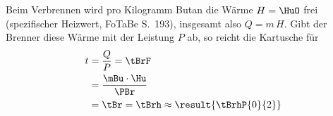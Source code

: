 Beim Verbrennen wird pro Kilogramm Butan die Wärme $H = \HuO$ frei (spezifischer Heizwert, FoTaBe S.~193), insgesamt also $Q = m\,H$. Gibt der Brenner diese Wärme mit der Leistung $P$ ab, so reicht die Kartusche für
\begin{align}
 t &= \frac{Q}{P} = \tBrF \\
   &= \frac{\mBu\cdot\Hu}{\PBr} \\
   &= \tBr = \tBrh \approx \result{\tBrhP{0}{2}}
\end{align}
